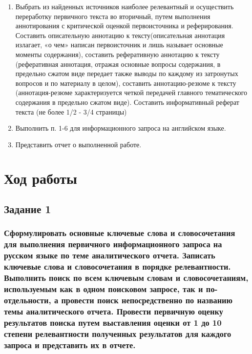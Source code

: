 \documentclass[14pt,a4paper,report]{report}
\begin{document}
\begin{enumerate}
	\item Выбрать из найденных источников наиболее релевантный и осуществить переработку первичного текста во вторичный, путем выполнения аннотирования с критической оценкой первоисточника и реферирования. Составить описательную аннотацию к тексту(описательная аннотация излагает, «о чем» написан первоисточник и лишь называет основные моменты содержания), составить реферативную аннотацию к тексту (реферативная аннотация, отражая основные вопросы содержания, в предельно сжатом виде передает также выводы по каждому из затронутых вопросов и по материалу в целом), составить аннотацию-резюме к тексту (аннотация-резюме характеризуется четкой передачей главного тематического содержания в предельно сжатом виде). Составить информативный реферат текста (не более 1/2 - 3/4 страницы)
	
	\item Выполнить п. 1-6 для информационного запроса на английском языке.
	
	\item Представить отчет о выполненной работе.
	
\end{enumerate}

\clearpage

\section{Ход работы}

\subsection{Задание 1}

\subsubsection{Сформулировать основные ключевые слова и словосочетания для выполнения первичного информационного запроса на русском языке по теме аналитического отчета. Записать ключевые слова и словосочетания в порядке релевантности. Выполнить поиск по всем ключевым словам и словосочетаниям, используемым как в одном поисковом запросе, так и по-отдельности, а провести поиск непосредственно по названию темы аналитического отчета. Провести первичную оценку результатов поиска путем выставления оценки от 1 до 10 степени релевантности полученных результатов для каждого запроса и представить их в отчете.}
\end{document}
